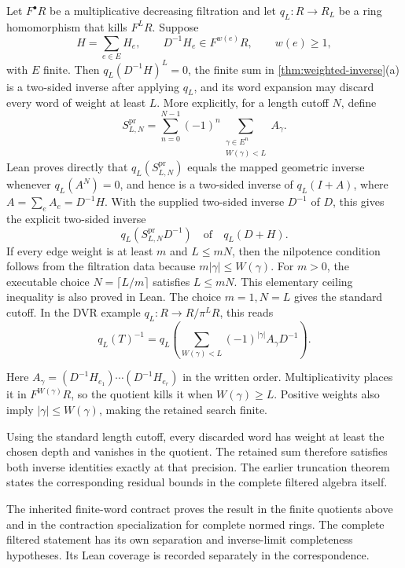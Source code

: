 \begin{corollary}\label{cor:finite-precision}
Let $F^\bullet R$ be a multiplicative decreasing filtration and let
$q_L:R\to R_L$ be a ring homomorphism that kills $F^L R$. Suppose
\[
H=\sum_{e\in E}H_e,
\qquad D^{-1}H_e\in F^{w(e)}R,
\qquad w(e)\ge1,
\]
with $E$ finite. Then $q_L(D^{-1}H)^L=0$, the finite sum in
\cref{thm:weighted-inverse}(a) is a two-sided inverse after applying $q_L$,
and its word expansion may discard every word of weight at least $L$.
More explicitly, for a length cutoff $N$, define
\[
S^{\mathrm{pr}}_{L,N}
=
\sum_{n=0}^{N-1}(-1)^n
\sum_{\substack{\gamma\in E^n\\W(\gamma)<L}}A_\gamma.
\]
Lean proves directly that $q_L(S^{\mathrm{pr}}_{L,N})$ equals the mapped
geometric inverse whenever $q_L(A^N)=0$, and hence is a two-sided inverse of
$q_L(I+A)$, where $A=\sum_eA_e=D^{-1}H$. With the supplied two-sided
inverse $D^{-1}$ of $D$, this gives the explicit two-sided inverse
\[
\boxed{q_L\!\left(S^{\mathrm{pr}}_{L,N}D^{-1}\right)}
\quad\text{of}\quad q_L(D+H).
\]
If every edge weight is at least $m$ and $L\le mN$, then the nilpotence
condition follows from the filtration data because
$m|\gamma|\le W(\gamma)$. For $m>0$, the executable choice
$N=\lceil L/m\rceil$ satisfies $L\le mN$. This elementary ceiling inequality
is also proved in Lean. The choice $m=1,N=L$ gives the standard cutoff.
In the DVR example $q_L:R\to R/\pi^L R$, this reads
\[
q_L(T)^{-1}
=
q_L\!\left(\sum_{W(\gamma)<L}
(-1)^{|\gamma|}A_\gamma D^{-1}\right).
\]
\end{corollary}

Here $A_\gamma=(D^{-1}H_{e_1})\cdots(D^{-1}H_{e_r})$ in the written
order. Multiplicativity places it in $F^{W(\gamma)}R$, so the quotient kills
it when $W(\gamma)\ge L$. Positive weights also imply
$|\gamma|\le W(\gamma)$, making the retained search finite.

\begin{interpretation}
Using the standard length cutoff, every discarded word has weight at least the chosen depth and vanishes in the quotient. The retained sum therefore satisfies both inverse identities exactly at that precision. The earlier truncation theorem states the corresponding residual bounds in the complete filtered algebra itself.
\end{interpretation}

The inherited finite-word contract proves the result in the finite quotients above and in the contraction specialization for complete normed rings. The complete filtered statement has its own separation and inverse-limit completeness hypotheses. Its Lean coverage is recorded separately in the correspondence.

